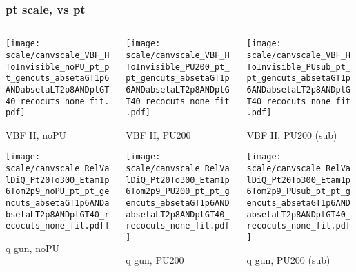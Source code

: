 \documentclass[8pt]{beamer}
\begin{document}
 \begin{frame}
  \frametitle{pt scale, vs pt}
  
  \begin{columns}
   \begin{column}{0.35\textwidth}
     \texttt{[image: scale/canvscale\_VBF\_HToInvisible\_noPU\_pt\_pt\_gencuts\_absetaGT1p6ANDabsetaLT2p8ANDptGT40\_recocuts\_none\_fit.pdf]}
     
     VBF H, noPU
    
     \texttt{[image: scale/canvscale\_RelValDiQ\_Pt20To300\_Etam1p6Tom2p9\_noPU\_pt\_pt\_gencuts\_absetaGT1p6ANDabsetaLT2p8ANDptGT40\_recocuts\_none\_fit.pdf]}
     
     q gun, noPU
   \end{column}
   \begin{column}{0.35\textwidth}
     \texttt{[image: scale/canvscale\_VBF\_HToInvisible\_PU200\_pt\_pt\_gencuts\_absetaGT1p6ANDabsetaLT2p8ANDptGT40\_recocuts\_none\_fit.pdf]}
     
     VBF H, PU200
    
     \texttt{[image: scale/canvscale\_RelValDiQ\_Pt20To300\_Etam1p6Tom2p9\_PU200\_pt\_pt\_gencuts\_absetaGT1p6ANDabsetaLT2p8ANDptGT40\_recocuts\_none\_fit.pdf]}
     
     q gun, PU200
   \end{column}
   \begin{column}{0.35\textwidth}
     \texttt{[image: scale/canvscale\_VBF\_HToInvisible\_PUsub\_pt\_pt\_gencuts\_absetaGT1p6ANDabsetaLT2p8ANDptGT40\_recocuts\_none\_fit.pdf]}
     
     VBF H, PU200 (sub)
    
     \texttt{[image: scale/canvscale\_RelValDiQ\_Pt20To300\_Etam1p6Tom2p9\_PUsub\_pt\_pt\_gencuts\_absetaGT1p6ANDabsetaLT2p8ANDptGT40\_recocuts\_none\_fit.pdf]}
     
     q gun, PU200 (sub)
   \end{column}
  \end{columns}
 \end{frame}
 
\end{document}

